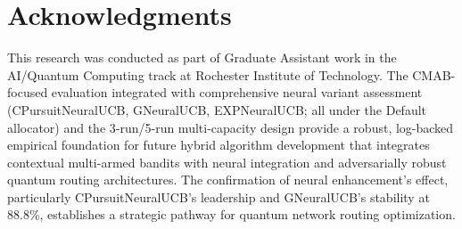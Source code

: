 \documentclass[12pt,a4paper]{article}
\begin{document}
\section{Acknowledgments}

This research was conducted as part of Graduate Assistant work in the AI/Quantum Computing track at Rochester Institute of Technology. The CMAB-focused evaluation integrated with comprehensive neural variant assessment (CPursuitNeuralUCB, GNeuralUCB, EXPNeuralUCB; all under the Default allocator) and the 3-run/5-run multi-capacity design provide a robust, log-backed empirical foundation for future hybrid algorithm development that integrates contextual multi-armed bandits with neural integration and adversarially robust quantum routing architectures. The confirmation of neural enhancement's effect, particularly CPursuitNeuralUCB's leadership and GNeuralUCB's stability at 88.8\%, establishes a strategic pathway for quantum network routing optimization.
\end{document}
